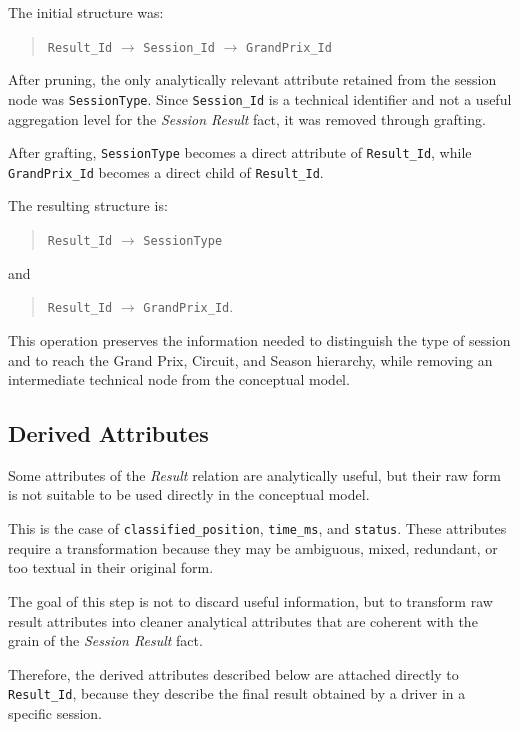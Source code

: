 \documentclass[a4paper,11pt]{article}
\begin{document}
	The initial structure was:
	
	\begin{quote}
		\texttt{Result\_Id} $\rightarrow$ \texttt{Session\_Id} $\rightarrow$ \texttt{GrandPrix\_Id}
	\end{quote}
	
	After pruning, the only analytically relevant attribute retained from the session node was
	\texttt{SessionType}. Since \texttt{Session\_Id} is a technical identifier and not a useful
	aggregation level for the \textit{Session Result} fact, it was removed through grafting.
	
	After grafting, \texttt{SessionType} becomes a direct attribute of \texttt{Result\_Id}, while
	\texttt{GrandPrix\_Id} becomes a direct child of \texttt{Result\_Id}.
	
	The resulting structure is:
	
	\begin{quote}
		\texttt{Result\_Id} $\rightarrow$ \texttt{SessionType}
	\end{quote}
	
	and
	
	\begin{quote}
		\texttt{Result\_Id} $\rightarrow$ \texttt{GrandPrix\_Id}.
	\end{quote}
	
	This operation preserves the information needed to distinguish the type of session and
	to reach the Grand Prix, Circuit, and Season hierarchy, while removing an intermediate
	technical node from the conceptual model.
		
		
	\subsection{Derived Attributes}
	
	Some attributes of the \textit{Result} relation are analytically useful, but their raw form
	is not suitable to be used directly in the conceptual model.
	
	This is the case of \texttt{classified\_position}, \texttt{time\_ms}, and
	\texttt{status}. These attributes require a transformation because they may be ambiguous,
	mixed, redundant, or too textual in their original form.
	
	The goal of this step is not to discard useful information, but to transform raw result
	attributes into cleaner analytical attributes that are coherent with the grain of the
	\textit{Session Result} fact.
	

	Therefore, the derived attributes described below are attached directly to
	\texttt{Result\_Id}, because they describe the final result obtained by a driver in a
	specific session.
	
\end{document}
